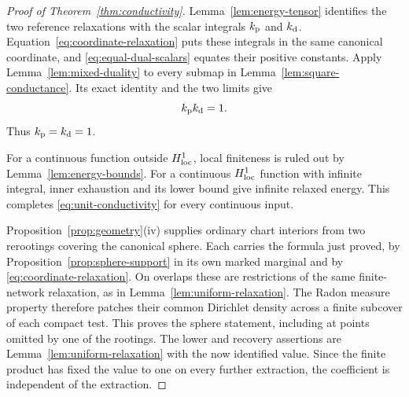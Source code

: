 \begin{proof}[Proof of Theorem~\ref{thm:conductivity}]
Lemma~\ref{lem:energy-tensor} identifies the two reference relaxations
with the scalar integrals \(k_{\rm p}\) and \(k_{\rm d}\).
Equation~\eqref{eq:coordinate-relaxation} puts these integrals in the
same canonical coordinate, and \eqref{eq:equal-dual-scalars} equates
their positive constants.  Apply Lemma~\ref{lem:mixed-duality} to every
submap in Lemma~\ref{lem:square-conductance}.  Its exact identity and
the two limits give
\[
                  k_{\rm p}k_{\rm d}=1.
\]
Thus \(k_{\rm p}=k_{\rm d}=1\).

For a continuous function outside \(H^1_{\rm loc}\), local finiteness
is ruled out by Lemma~\ref{lem:energy-bounds}.  For a continuous
\(H^1_{\rm loc}\) function with infinite integral, inner exhaustion
and its lower bound give infinite relaxed energy.  This completes
\eqref{eq:unit-conductivity} for every continuous input.

Proposition~\ref{prop:geometry}(iv) supplies ordinary chart interiors
from two rerootings covering the canonical sphere.  Each carries the
formula just proved, by Proposition~\ref{prop:sphere-support} in its
own marked marginal and by \eqref{eq:coordinate-relaxation}.  On
overlaps these are restrictions of the same finite-network relaxation,
as in Lemma~\ref{lem:uniform-relaxation}.  The Radon measure property
therefore patches their common Dirichlet density across a finite
subcover of each compact test.  This proves the sphere statement,
including at points omitted by one of the rootings.  The lower and
recovery assertions are Lemma~\ref{lem:uniform-relaxation} with the
now identified value.  Since the finite product has fixed the value
to one on every further extraction, the coefficient is independent
of the extraction.
\end{proof}
